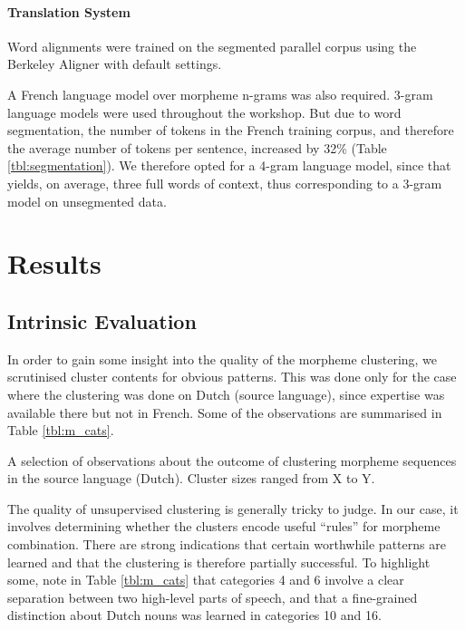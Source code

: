 \paragraph{Translation System}
Word alignments were trained on the segmented parallel corpus using the Berkeley Aligner \citep{Liang2006} with default settings.

A French language model over morpheme n-grams was also required.
3-gram language models were used throughout the workshop.
But due to word segmentation, the number of tokens in the French training corpus, and therefore the average number of tokens per sentence, increased by 32\% (Table \ref{tbl:segmentation}).
We therefore opted for a 4-gram language model, since that yields, on average, three full words of context, thus corresponding to a 3-gram model on unsegmented data.

\section{Results}

\subsection{Intrinsic Evaluation}
In order to gain some insight into the quality of the morpheme clustering, we scrutinised cluster contents for obvious patterns.
This was done only for the case where the clustering was done on Dutch (source language), since expertise was available there but not in French.
Some of the observations are summarised in Table \ref{tbl:m_cats}. 

\begin{table}[hbt]
  \centering
  
  \caption{A selection of observations about the outcome of clustering morpheme sequences in the source language (Dutch). Cluster sizes ranged from X to Y.}
  \label{tbl:m_cats}
\end{table}

The quality of unsupervised clustering is generally tricky to judge.
In our case, it involves determining whether the clusters encode useful ``rules'' for morpheme combination.
There are strong indications that certain worthwhile patterns are learned and that the clustering is therefore partially successful.
To highlight some, note in Table \ref{tbl:m_cats} that categories 4 and 6 involve a clear separation between two high-level parts of speech, and that a fine-grained distinction about Dutch nouns was learned in categories 10 and 16.

